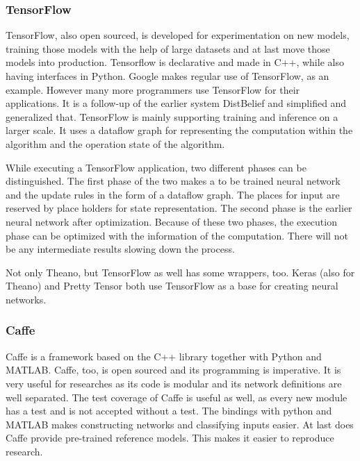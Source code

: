 \documentclass[10pt,a4paper]{report}
\begin{document}
	\subsubsection{TensorFlow}
	
	TensorFlow, also open sourced, is developed for experimentation on new 
	models, training those models with the help of large datasets and at last 
	move those models into production.\cite{abadi2016tensorflow} Tensorflow 
	is 
	declarative and made in C++, while also having interfaces in Python. 
	\cite{rampasek2016tensorflow} Google makes regular use of TensorFlow, 
	as an example. However many more programmers use TensorFlow for their 
	applications. It is a follow-up of the earlier system DistBelief and 
	simplified and generalized that. TensorFlow is mainly supporting training 
	and inference on a larger scale. It uses a dataflow graph for representing 
	the computation within the algorithm and the operation state of the 
	algorithm. \cite{abadi2016tensorflow}
	
	While executing a TensorFlow application, two different phases can be 
	distinguished. The first phase of the two makes a to be trained neural 
	network and the update rules in the form of a dataflow graph. The places 
	for input are reserved by place holders for state representation. The 
	second phase is the earlier neural network after optimization. Because of 
	these two phases, the execution phase can be optimized with the information 
	of the computation. There will not be any intermediate results slowing down 
	the process. \cite{abadi2016tensorflow}
	
	Not only Theano, but TensorFlow as well has some wrappers, too. Keras (also 
	for Theano) and Pretty Tensor both use TensorFlow as a base for creating 
	neural networks. \cite{rampasek2016tensorflow}
	
	\subsubsection{Caffe}
	
	Caffe is a framework based on the C++ library together with Python and 
	MATLAB. Caffe, too, is open sourced and its programming is imperative. 
	\cite{rampasek2016tensorflow} It is very useful for researches as 
	its code is modular and its network definitions are well separated. The 
	test coverage of Caffe is useful as well, as every new module has a test 
	and is not accepted without a test. The bindings with python and MATLAB 
	makes constructing networks and classifying inputs easier. At last does 
	Caffe provide pre-trained reference models. This makes it easier to 
	reproduce research.
	\cite{DBLP:journals/corr/JiaSDKLGGD14}
	
\end{document}
